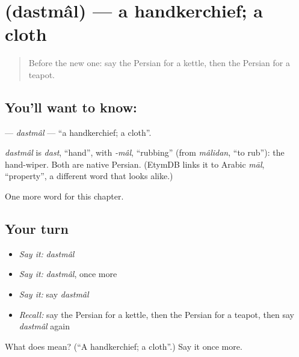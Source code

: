 \section[\texorpdfstring{\fa{دستمال} (dastmâl)}{دستمال (dastmâl)}]{ (dastmâl) — a handkerchief; a cloth}

\label{lesson:FA-C239-dastmal}



\begin{quote}
Before the new one: say the Persian for a kettle, then the Persian for a teapot.
\end{quote}

\subsection*{You'll want to know: }
\textbf{} — \emph{dastmâl} — \textquotedblleft{}a handkerchief; a cloth\textquotedblright{}.

\begin{cousinweb}
\emph{dastmâl} is \emph{dast}, \textquotedblleft{}hand\textquotedblright{}, with \emph{-mâl}, \textquotedblleft{}rubbing\textquotedblright{} (from \emph{mâlidan}, \textquotedblleft{}to rub\textquotedblright{}): the hand-wiper. Both are native Persian. (EtymDB links it to Arabic \emph{māl}, \textquotedblleft{}property\textquotedblright{}, a different word that looks alike.)
\end{cousinweb}

\begin{grammarlens}[title={What you've built}]
One more word for this chapter.
\end{grammarlens}

\subsection*{Your turn}
\begin{itemize}
\raggedright
  \item \emph{Say it:} \emph{dastmâl}
  \item \emph{Say it:} \emph{dastmâl}, once more
  \item \emph{Say it:} say \emph{dastmâl}
  \item \emph{Recall:} say the Persian for a kettle, then the Persian for a teapot, then say \emph{dastmâl} again
\end{itemize}

\begin{tcolorbox}[breakable,colback=teal!4,colframe=teal!35!black,title={Before you move on}]
What does  mean? (\textquotedblleft{}A handkerchief; a cloth\textquotedblright{}.) Say it once more.
\end{tcolorbox}
